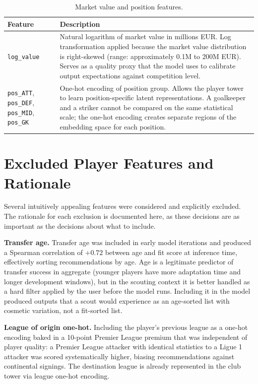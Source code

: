 \documentclass[12pt, a4paper, oneside]{report}
\begin{document}
\begin{table}[H]
\centering
\caption{Market value and position features.}
\label{tab:mv_pos_features}
\begin{tabular}{p{3.5cm} p{9.5cm}}
\toprule
\textbf{Feature} & \textbf{Description} \\
\midrule
\texttt{log\_value} & Natural logarithm of market value in millions EUR. Log transformation applied because the market value distribution is right-skewed (range: approximately 0.1M to 200M EUR). Serves as a quality proxy that the model uses to calibrate output expectations against competition level. \\[4pt]
\texttt{pos\_ATT}, \texttt{pos\_DEF}, \texttt{pos\_MID}, \texttt{pos\_GK} & One-hot encoding of position group. Allows the player tower to learn position-specific latent representations. A goalkeeper and a striker cannot be compared on the same statistical scale; the one-hot encoding creates separate regions of the embedding space for each position. \\
\bottomrule
\end{tabular}
\end{table}

\section{Excluded Player Features and Rationale}
\label{sec:excluded_features}

Several intuitively appealing features were considered and explicitly excluded. The rationale for each exclusion is documented here, as these decisions are as important as the decisions about what to include.

\textbf{Transfer age.} Transfer age was included in early model iterations and produced a Spearman correlation of $+0.72$ between age and fit score at inference time, effectively sorting recommendations by age. Age is a legitimate predictor of transfer success in aggregate (younger players have more adaptation time and longer development windows), but in the scouting context it is better handled as a hard filter applied by the user before the model runs. Including it in the model produced outputs that a scout would experience as an age-sorted list with cosmetic variation, not a fit-sorted list.

\textbf{League of origin one-hot.} Including the player's previous league as a one-hot encoding baked in a 10-point Premier League premium that was independent of player quality: a Premier League attacker with identical statistics to a Ligue 1 attacker was scored systematically higher, biasing recommendations against continental signings. The destination league is already represented in the club tower via league one-hot encoding.
\end{document}
